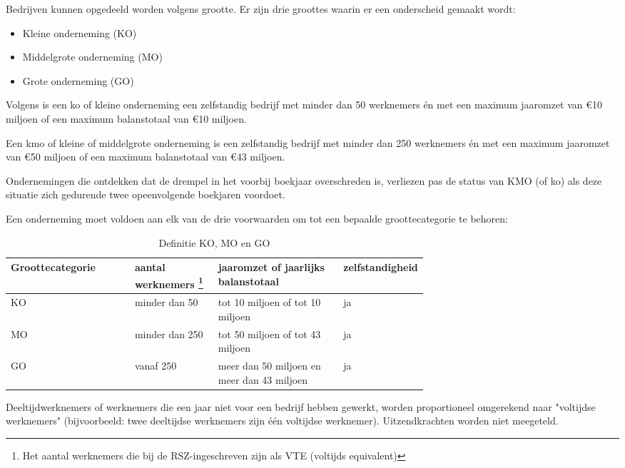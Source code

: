 Bedrijven kunnen opgedeeld worden volgens grootte. Er zijn drie groottes waarin er een onderscheid gemaakt wordt:

\begin{itemize}
    \item Kleine onderneming (KO)
    \item Middelgrote onderneming (MO)
    \item Grote onderneming (GO)
\end{itemize}

Volgens \textcite{Vlaio2014} is een ko of kleine onderneming een zelfstandig bedrijf met minder dan 50 werknemers én met een maximum jaaromzet van €10 miljoen of een maximum balanstotaal van €10 miljoen.

Een kmo of kleine of middelgrote onderneming is een zelfstandig bedrijf met minder dan 250 werknemers én met een maximum jaaromzet van €50 miljoen of een maximum balanstotaal van €43 miljoen.

Ondernemingen die ontdekken dat de drempel in het voorbij boekjaar overschreden is, verliezen pas de status van KMO (of ko) als deze situatie zich gedurende twee opeenvolgende boekjaren voordoet.

\newpage
Een onderneming moet voldoen aan elk van de drie voorwaarden om tot een bepaalde groottecategorie te behoren:

\begin{table}[ht]
    \centering
    \caption{Definitie KO, MO en GO}
    \begin{tabular}[t]{l>{\raggedright}p{0.2\linewidth}>{\raggedright\arraybackslash}p{0.3\linewidth}>{\raggedright\arraybackslash}p{0.18\linewidth}}
        \toprule
        \textbf{Groottecategorie} & \textbf{aantal werknemers \footnote{ Het aantal werknemers die bij de RSZ-ingeschreven zijn als VTE (voltijds equivalent)} } & \textbf{jaaromzet of jaarlijks balanstotaal} & \textbf{zelfstandigheid} \\
        \midrule
        KO & minder dan 50 & tot 10 miljoen of tot 10 miljoen & ja \\
        MO  &minder dan 250 & tot 50 miljoen of tot 43 miljoen & ja \\
        GO & vanaf 250 & meer dan 50 miljoen en meer dan 43 miljoen & ja \\
        \bottomrule
    \end{tabular}
\end{table}


Deeltijdwerknemers of werknemers die een jaar niet voor een bedrijf hebben gewerkt, worden proportioneel omgerekend naar "voltijdse werknemers" (bijvoorbeeld: twee deeltijdse werknemers zijn één voltijdse werknemer). Uitzendkrachten worden niet meegeteld.

